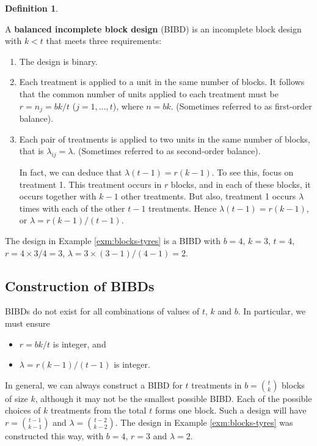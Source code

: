 \documentclass[
]{book}
\providecommand{\tightlist}{%
  \setlength{\itemsep}{0pt}\setlength{\parskip}{0pt}}
\theoremstyle{definition}
\newtheorem{definition}{Definition}[chapter]
\theoremstyle{definition}
\theoremstyle{definition}
\theoremstyle{definition}
\theoremstyle{remark}
\begin{document}
\begin{definition}
\protect\hypertarget{def:bibd}{}\label{def:bibd}

A \textbf{balanced incomplete block design} (BIBD) is an incomplete block design with \(k<t\) that meets three requirements:

\begin{enumerate}
\def\labelenumi{\arabic{enumi}.}
\item
  The design is binary.
\item
  Each treatment is applied to a unit in the same number of blocks. It follows that the common number of units applied to each treatment must be \(r = n_j = bk / t\) (\(j=1,\ldots, t\)), where \(n = bk\). (Sometimes referred to as first-order balance).
\item
  Each pair of treatments is applied to two units in the same number of blocks, that is \(\lambda_{ij} = \lambda\). (Sometimes referred to as second-order balance).

  In fact, we can deduce that \(\lambda(t-1) = r(k - 1)\). To see this, focus on treatment 1. This treatment occurs in \(r\) blocks, and in each of these blocks, it occurs together with \(k-1\) other treatments. But also, treatment 1 occurs \(\lambda\) times with each of the other \(t-1\) treatments. Hence \(\lambda(t-1) = r(k - 1)\), or \(\lambda = r(k - 1) / (t-1)\).
\end{enumerate}

\end{definition}

The design in Example \ref{exm:blocks-tyres} is a BIBD with \(b=4\), \(k=3\), \(t = 4\), \(r = 4\times 3 / 4 = 3\), \(\lambda = 3 \times (3-1) / (4-1) = 2\).

\hypertarget{construction-of-bibds}{%
\subsection{Construction of BIBDs}\label{construction-of-bibds}}

BIBDs do not exist for all combinations of values of \(t\), \(k\) and \(b\). In particular, we must ensure

\begin{itemize}
\tightlist
\item
  \(r=bk/t\) is integer, and
\item
  \(\lambda = r(k - 1) / (t-1)\) is integer.
\end{itemize}

In general, we can always construct a BIBD for \(t\) treatments in \(b = {t \choose k}\) blocks of size \(k\), although it may not be the smallest possible BIBD. Each of the possible choices of \(k\) treatments from the total \(t\) forms one block. Such a design will have \(r = {t-1 \choose k-1}\) and \(\lambda = {t-2 \choose k-2}\). The design in Example \ref{exm:blocks-tyres} was constructed this way, with \(b = 4\), \(r = 3\) and \(\lambda = 2\).
\end{document}
